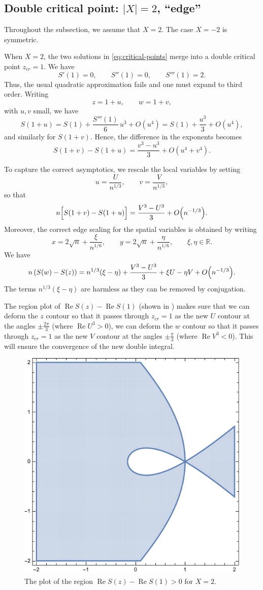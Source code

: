 \documentclass[letterpaper,11pt,oneside,reqno]{article}
\numberwithin{equation}{section}
\theoremstyle{definition}
\begin{document}
\subsection{Double critical point: $|X|=2$, ``edge''}
\label{sub:double-critical-points}

Throughout the subsection, we assume that $X=2$. The case $X=-2$ is symmetric.

When \(X=2\), the two solutions in \eqref{eq:critical-points} merge into a double critical point
$z_{cr}=1$.
We have
\[
S'(1)=0,\qquad S''(1)=0,\qquad S'''(1)=2.
\]
Thus, the usual quadratic approximation fails and one must expand to third order. Writing
\[
z=1+u,\qquad w=1+v,
\]
with \(u,v\) small, we have
\[
S(1+u)=S(1)+\frac{S'''(1)}{6}\,u^3+O(u^4)
=S(1)+\frac{u^3}{3}+O(u^4),
\]
and similarly for \(S(1+v)\). Hence, the difference in the exponents becomes
\[
S(1+v)-S(1+u)=\frac{v^3-u^3}{3}+O(u^4+v^4).
\]

To capture the correct asymptotics, we rescale the local variables by setting
\[
u=\frac{U}{n^{1/3}},\qquad v=\frac{V}{n^{1/3}},
\]
so that
\[
n\Bigl[S(1+v)-S(1+u)\Bigr]=\frac{V^3-U^3}{3}+O\Bigl(n^{-1/3}\Bigr).
\]
Moreover, the correct edge scaling for the spatial variables is obtained by writing
\[
x=2\sqrt{n}+\frac{\xi}{n^{1/6}},\qquad y=2\sqrt{n}+\frac{\eta}{n^{1/6}},\qquad \xi,\eta\in\mathbb{R}.
\]
We have
\begin{equation*}
	n\left( S(w)-S(z) \right)=n^{1/3}(\xi-\eta)+
	\frac{V^3-U^3}{3}+\xi U-\eta V+O\Bigl(n^{-1/3}\Bigr).
\end{equation*}
The terms $n^{1/3}(\xi-\eta)$ are harmless as they can be removed
by conjugation. 

The region plot of $\operatorname{Re}S(z)-\operatorname{Re}S(1)$
(shown in )
makes sure that we can deform the $z$ contour so that it passes through $z_{cr}=1$
as the new $U$ contour at the angles $\pm \frac{2\pi}{3}$ (where $\operatorname{Re}U^3>0$),
we can deform the $w$ contour so that it passes through $z_{cr}=1$
as the new $V$ contour at the angles $\pm \frac{\pi}{3}$ (where $\operatorname{Re}V^3<0$).
This will ensure the convergence of the new double integral.

\begin{figure}[htpb]
	\centering
	\includegraphics[height=.3\textwidth]{pictures/ReS_edge.pdf}
	\caption{The plot of the region $\operatorname{Re}S(z)-\operatorname{Re}S(1)>0$ for $X=2$.}
	\label{fig:ReS_edge}
\end{figure}
\end{document}
